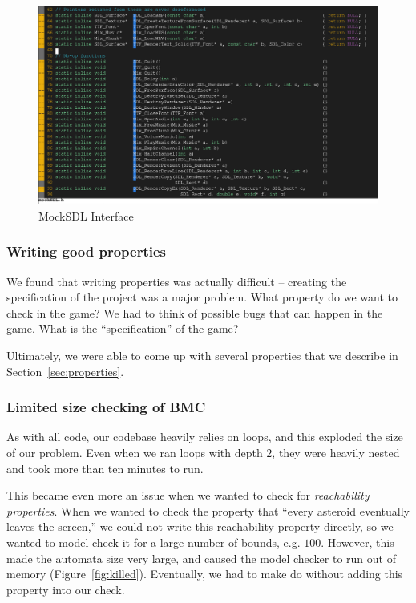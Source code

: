 \documentclass{article}
\begin{document}
            \begin{figure}[h!]
                \includegraphics[width=\linewidth]{mock-sdl.png}
                \caption{MockSDL Interface}
                \label{fig:mock-sdl}
            \end{figure}

        \subsubsection{Writing good properties}

            We found that writing properties was actually difficult -- creating
            the specification of the project was a major problem. What property
            do we want to check in the game? We had to think of possible bugs
            that can happen in the game. What is the ``specification'' of the
            game?

            Ultimately, we were able to come up with several properties that we
            describe in Section~\ref{sec:properties}.

        \subsubsection{Limited size checking of BMC}
            As with all code, our codebase heavily relies on loops, and this
            exploded the size of our problem. Even when we ran loops with depth
            $2$, they were heavily nested and took more than ten minutes to run.

            This became even more an issue when we wanted to check for
            \emph{reachability properties}. When we wanted to check the property
            that ``every asteroid eventually leaves the screen,'' we could not
            write this reachability property directly, so we wanted to model
            check it for a large number of bounds, e.g. $100$. However, this
            made the automata size very large, and caused the model checker to
            run out of memory (Figure~\ref{fig:killed}). Eventually, we had to
            make do without adding this property into our check.
\end{document}
